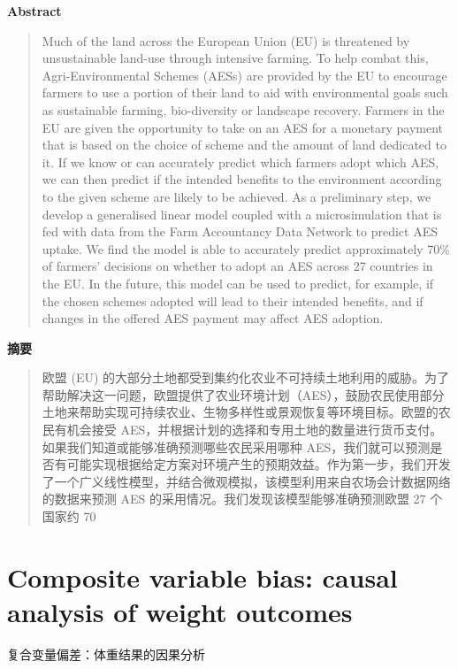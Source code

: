\vspace{1.5em}
\noindent\textbf{Abstract}\par
\begin{quote}\small
Much of the land across the European Union (EU) is threatened by unsustainable land-use through intensive farming. To help combat this, Agri-Environmental Schemes (AESs) are provided by the EU to encourage farmers to use a portion of their land to aid with environmental goals such as sustainable farming, bio-diversity or landscape recovery. Farmers in the EU are given the opportunity to take on an AES for a monetary payment that is based on the choice of scheme and the amount of land dedicated to it. If we know or can accurately predict which farmers adopt which AES, we can then predict if the intended benefits to the environment according to the given scheme are likely to be achieved. As a preliminary step, we develop a generalised linear model coupled with a microsimulation that is fed with data from the Farm Accountancy Data Network to predict AES uptake. We find the model is able to accurately predict approximately 70\% of farmers’ decisions on whether to adopt an AES across 27 countries in the EU. In the future, this model can be used to predict, for example, if the chosen schemes adopted will lead to their intended benefits, and if changes in the offered AES payment may affect AES adoption.
\end{quote}

\noindent\textbf{摘要}\par
\begin{quote}\small
欧盟 (EU) 的大部分土地都受到集约化农业不可持续土地利用的威胁。为了帮助解决这一问题，欧盟提供了农业环境计划（AES），鼓励农民使用部分土地来帮助实现可持续农业、生物多样性或景观恢复等环境目标。欧盟的农民有机会接受 AES，并根据计划的选择和专用土地的数量进行货币支付。如果我们知道或能够准确预测哪些农民采用哪种 AES，我们就可以预测是否有可能实现根据给定方案对环境产生的预期效益。作为第一步，我们开发了一个广义线性模型，并结合微观模拟，该模型利用来自农场会计数据网络的数据来预测 AES 的采用情况。我们发现该模型能够准确预测欧盟 27 个国家约 70%
\end{quote}

\vspace{0.5em}


\chapter{Composite variable bias: causal analysis of weight outcomes}
\begin{center}\small 复合变量偏差：体重结果的因果分析\end{center}

